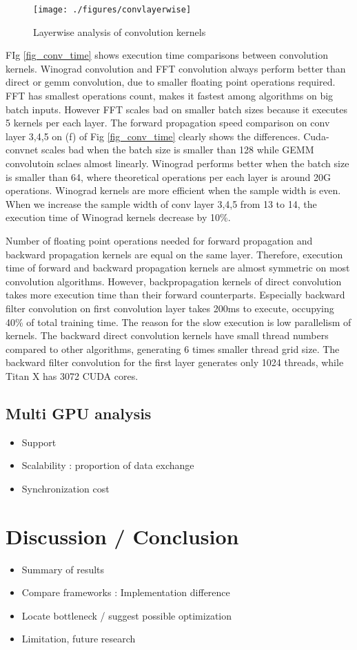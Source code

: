 \begin{figure*}
  \centering
  \texttt{[image: ./figures/convlayerwise]}
  \caption{Layerwise analysis of convolution kernels}
  \label{fig_layerwise}
\end{figure*}

FIg \ref{fig_conv_time} shows execution time comparisons between convolution kernels.
Winograd convolution and FFT convolution always perform better than direct or gemm convolution, due to smaller floating point operations required.
FFT has smallest operations count, makes it fastest among algorithms on big batch inputs.
However FFT scales bad on smaller batch sizes because it executes 5 kernels per each layer.
The forward propagation speed comparison on conv layer 3,4,5 on (f) of Fig \ref{fig_conv_time} clearly shows the differences.
Cuda-convnet scales bad when the batch size is smaller than 128 while GEMM convolutoin sclaes almost linearly.
Winograd performs better when the batch size is smaller than 64, where theoretical operations per each layer is around 20G operations.
Winograd kernels are more efficient when the sample width is even.
When we increase the sample width of conv layer 3,4,5 from 13 to 14, the execution time of Winograd kernels decrease by 10\%.

Number of floating point operations needed for forward propagation and backward propagation kernels are equal on the same layer.
Therefore, execution time of forward and backward propagation kernels are almost symmetric on most convolution algorithms.
However, backpropagation kernels of direct convolution takes more execution time than their forward counterparts.
Especially backward filter convolution on first convolution layer takes 200ms to execute, occupying 40\% of total training time.
The reason for the slow execution is low parallelism of kernels.
The backward direct convolution kernels have small thread numbers compared to other algorithms, generating 6 times smaller thread grid size.
The backward filter convolution for the first layer generates only 1024 threads, while Titan X has 3072 CUDA cores.




\subsection{Multi GPU analysis}

\begin{itemize}
  \item Support
  \item Scalability : proportion of data exchange
  \item Synchronization cost
\end{itemize}

\section{Discussion / Conclusion}

\begin{itemize}
  \item Summary of results
  \item Compare frameworks : Implementation difference
  \item Locate bottleneck / suggest possible optimization
  \item Limitation, future research
\end{itemize}
